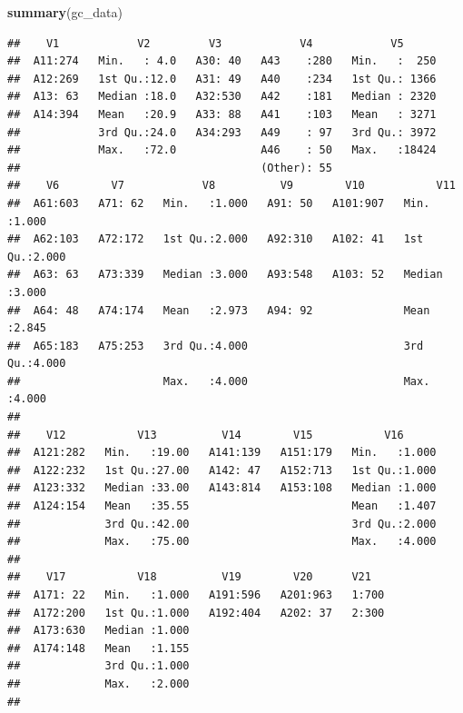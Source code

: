 \documentclass[]{article}
\newenvironment{Shaded}{\begin{snugshade}}{\end{snugshade}}
\newcommand{\KeywordTok}[1]{\textcolor[rgb]{0.13,0.29,0.53}{\textbf{#1}}}
\newcommand{\NormalTok}[1]{#1}
\begin{document}
\begin{Shaded}
\begin{Highlighting}[]
\KeywordTok{summary}\NormalTok{(gc_data)}
\end{Highlighting}
\end{Shaded}

\begin{verbatim}
##    V1            V2         V3            V4            V5       
##  A11:274   Min.   : 4.0   A30: 40   A43    :280   Min.   :  250  
##  A12:269   1st Qu.:12.0   A31: 49   A40    :234   1st Qu.: 1366  
##  A13: 63   Median :18.0   A32:530   A42    :181   Median : 2320  
##  A14:394   Mean   :20.9   A33: 88   A41    :103   Mean   : 3271  
##            3rd Qu.:24.0   A34:293   A49    : 97   3rd Qu.: 3972  
##            Max.   :72.0             A46    : 50   Max.   :18424  
##                                     (Other): 55                  
##    V6        V7            V8          V9        V10           V11       
##  A61:603   A71: 62   Min.   :1.000   A91: 50   A101:907   Min.   :1.000  
##  A62:103   A72:172   1st Qu.:2.000   A92:310   A102: 41   1st Qu.:2.000  
##  A63: 63   A73:339   Median :3.000   A93:548   A103: 52   Median :3.000  
##  A64: 48   A74:174   Mean   :2.973   A94: 92              Mean   :2.845  
##  A65:183   A75:253   3rd Qu.:4.000                        3rd Qu.:4.000  
##                      Max.   :4.000                        Max.   :4.000  
##                                                                          
##    V12           V13          V14        V15           V16       
##  A121:282   Min.   :19.00   A141:139   A151:179   Min.   :1.000  
##  A122:232   1st Qu.:27.00   A142: 47   A152:713   1st Qu.:1.000  
##  A123:332   Median :33.00   A143:814   A153:108   Median :1.000  
##  A124:154   Mean   :35.55                         Mean   :1.407  
##             3rd Qu.:42.00                         3rd Qu.:2.000  
##             Max.   :75.00                         Max.   :4.000  
##                                                                  
##    V17           V18          V19        V20      V21    
##  A171: 22   Min.   :1.000   A191:596   A201:963   1:700  
##  A172:200   1st Qu.:1.000   A192:404   A202: 37   2:300  
##  A173:630   Median :1.000                                
##  A174:148   Mean   :1.155                                
##             3rd Qu.:1.000                                
##             Max.   :2.000                                
## 
\end{verbatim}
\end{document}
